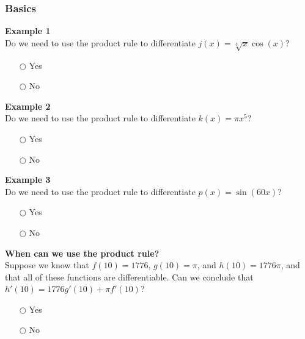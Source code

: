 \documentclass[pdftex, brazil, 12pt, twoside]{article}
\begin{document}
\subsubsection{Basics}
\label{u2-product-rule-basics}

\begin{exercise}
  \textbf{Example 1}\\%
  Do we need to use the product rule to differentiate $j(x)=\sqrt[3]{x}\cos{(x)}$?
  \begin{itemize}[noitemsep]
  \item[$\bigcirc$] Yes
  \item[$\bigcirc$] No
  \end{itemize}
\end{exercise}

\begin{exercise}
  \textbf{Example 2}\\%
  Do we need to use the product rule to differentiate $k(x)=\pi x^5$?
  \begin{itemize}[noitemsep]
  \item[$\bigcirc$] Yes
  \item[$\bigcirc$] No
  \end{itemize}
\end{exercise}

\begin{exercise}
  \textbf{Example 3}\\%
  Do we need to use the product rule to differentiate $p(x)=\sin{(60x)}$?
  \begin{itemize}[noitemsep]
  \item[$\bigcirc$] Yes
  \item[$\bigcirc$] No
  \end{itemize}
\end{exercise}

\begin{exercise}
  \textbf{When can we use the product rule?}\\%
  Suppose we know that $f(10)=1776$, $g(10)=\pi$, and $h(10)=1776\pi$, and
  that all of these functions are differentiable. Can we conclude that
  $h'(10)=1776g'(10) + \pi f'(10)$?
  \begin{itemize}[noitemsep]
  \item[$\bigcirc$] Yes
  \item[$\bigcirc$] No
  \end{itemize}
\end{exercise}

\end{document}
